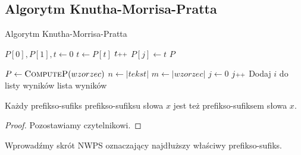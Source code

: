 \subsection{Algorytm Knutha-Morrisa-Pratta}

\begin{algorithm}[H]
	\caption{Algorytm Knutha-Morrisa-Pratta}
	\label{KMP}
	\begin{algorithmic}[1]
		\State $P[0], P[1], t \gets 0$
		\State $t \gets P[t]$
		\EndWhile
		\State $t\pp$
		\EndIf
		\State $P[j] \gets t$
		\EndFor
		\State \Return $P$
		\EndProcedure
		
		\State $P \gets \textsc{ComputeP}(wzorzec)$
		\State $n \gets |tekst|$
		\State $m \gets |wzorzec|$
		\State $j \gets 0$
				\State $j\pp$
			\EndWhile
				\State Dodaj $i$ do listy wyników
			\EndIf
		\EndFor
		\State \Return lista wyników
		\EndProcedure		
	\end{algorithmic}
\end{algorithm}

\begin{fact}
	\label{prefiksosufiks}
	Każdy prefikso-sufiks prefikso-sufiksu słowa $x$ jest też prefikso-sufiksem słowa $x$.
	\begin{proof}
		Pozostawiamy czytelnikowi.
	\end{proof}
\end{fact}

Wprowadźmy skrót NWPS oznaczający najdłuższy właściwy prefikso-sufiks.

